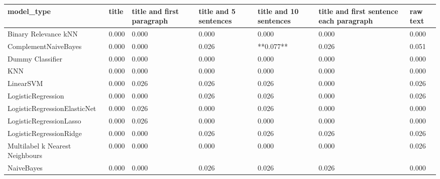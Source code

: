 \begin{tabular}{lllllll}
\toprule
                     model\_type & title & title and first paragraph & title and 5 sentences & title and 10 sentences & title and first sentence each paragraph & raw text \\
\midrule
           Binary Relevance kNN & 0.000 &                     0.000 &                 0.000 &                  0.000 &                                   0.000 &    0.000 \\
           ComplementNaiveBayes & 0.000 &                     0.000 &                 0.026 &              **0.077** &                                   0.026 &    0.051 \\
               Dummy Classifier & 0.000 &                     0.000 &                 0.000 &                  0.000 &                                   0.000 &    0.000 \\
                            KNN & 0.000 &                     0.000 &                 0.000 &                  0.000 &                                   0.000 &    0.000 \\
                      LinearSVM & 0.000 &                     0.026 &                 0.026 &                  0.026 &                                   0.000 &    0.026 \\
             LogisticRegression & 0.000 &                     0.000 &                 0.026 &                  0.026 &                                   0.000 &    0.026 \\
   LogisticRegressionElasticNet & 0.000 &                     0.026 &                 0.000 &                  0.026 &                                   0.000 &    0.000 \\
        LogisticRegressionLasso & 0.000 &                     0.026 &                 0.000 &                  0.000 &                                   0.000 &    0.000 \\
        LogisticRegressionRidge & 0.000 &                     0.000 &                 0.026 &                  0.026 &                                   0.026 &    0.026 \\
Multilabel k Nearest Neighbours & 0.000 &                     0.000 &                 0.000 &                  0.000 &                                   0.000 &    0.026 \\
                     NaiveBayes & 0.000 &                     0.000 &                 0.026 &                  0.026 &                                   0.026 &    0.000 \\

\end{tabular}
